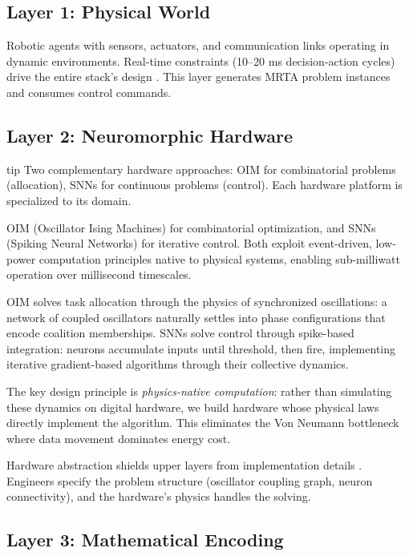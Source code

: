 \subsection{Layer 1: Physical World}

Robotic agents with sensors, actuators, and communication links operating in dynamic environments. Real-time constraints (10--20 ms decision-action cycles) drive the entire stack's design \cite{Siciliano2016}. This layer generates MRTA problem instances and consumes control commands.

\subsection{Layer 2: Neuromorphic Hardware}

\begin{block}{tip}
Two complementary hardware approaches: OIM for combinatorial problems (allocation), SNNs for continuous problems (control). Each hardware platform is specialized to its domain.
\end{block}

OIM (Oscillator Ising Machines) \cite{Wang2019} for combinatorial optimization, and SNNs (Spiking Neural Networks) \cite{Gerstner2014} for iterative control. Both exploit event-driven, low-power computation principles native to physical systems, enabling sub-milliwatt operation over millisecond timescales.

OIM solves task allocation through the physics of synchronized oscillations: a network of coupled oscillators naturally settles into phase configurations that encode coalition memberships. SNNs solve control through spike-based integration: neurons accumulate inputs until threshold, then fire, implementing iterative gradient-based algorithms through their collective dynamics.

The key design principle is \textit{physics-native computation}: rather than simulating these dynamics on digital hardware, we build hardware whose physical laws directly implement the algorithm. This eliminates the Von Neumann bottleneck where data movement dominates energy cost.

Hardware abstraction shields upper layers from implementation details \cite{Hennessy2019}. Engineers specify the problem structure (oscillator coupling graph, neuron connectivity), and the hardware's physics handles the solving.

\subsection{Layer 3: Mathematical Encoding}

